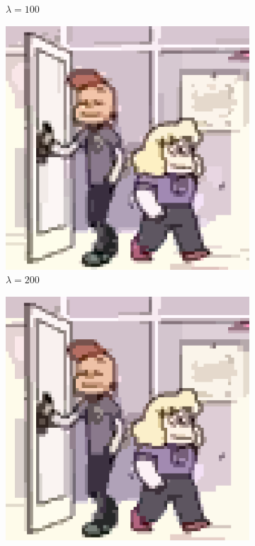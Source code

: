 \documentclass[10pt,twocolumn,letterpaper]{article}
\begin{document}
\begin{figure}
\begin{subfigure}{.48\linewidth}
\caption{$\lambda = 100$}
\end{subfigure}
\begin{subfigure}{.48\linewidth}
\includegraphics[width=\linewidth]{alphaResults/sadylars_large_0200.png}
\caption{$\lambda = 200$}
\end{subfigure}
\begin{subfigure}{.48\linewidth}
\includegraphics[width=\linewidth]{alphaResults/sadylars_large_0400.png}

\end{subfigure}
\end{figure}
\end{document}
